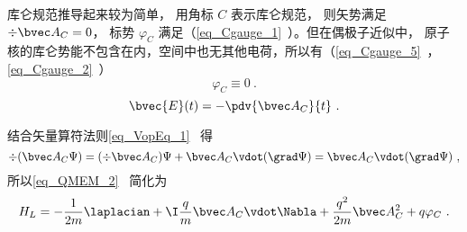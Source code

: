 
\begin{issues}
\issueDraft
\end{issues}


库仑规范推导起来较为简单， 用角标 $C$ 表示库仑规范， 则矢势满足 $\div \bvec A_C = 0$， 标势 $\varphi_C$ 满足（\autoref{eq_Cgauge_1}~）。但在偶极子近似中， 原子核的库仑势能不包含在内，空间中也无其他电荷，所以有（\autoref{eq_Cgauge_5}~，\autoref{eq_Cgauge_2}~）
\begin{equation}
\varphi_C \equiv 0~.
\end{equation}
\begin{equation}
\bvec {E}(t) = -\pdv{\bvec A_C}{t}~.
\end{equation}

结合矢量算符法则\autoref{eq_VopEq_1}~ 得
\begin{equation}
\div (\bvec A_C \Psi) = (\div \bvec A_C) \Psi + \bvec A_C \vdot (\grad \Psi) = \bvec A_C \vdot (\grad \Psi)~,
\end{equation}
所以\autoref{eq_QMEM_2}~ 简化为
\begin{equation}\label{eq_CouGau_4}
H_L = -\frac{1}{2m} \laplacian + \I \frac{q}{m} \bvec A_C \vdot \Nabla + \frac{q^2}{2m} \bvec A_C^2 + q\varphi_C~.
\end{equation}
